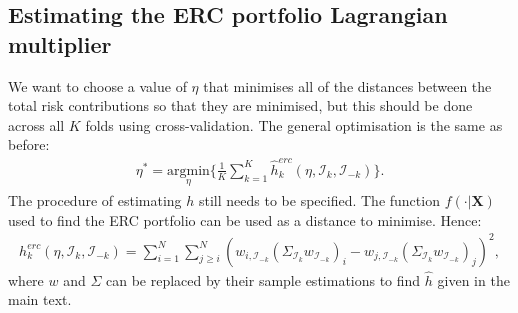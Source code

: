 \documentclass[
]{article}
\begin{document}
\hypertarget{etaest}{%
\subsection{Estimating the ERC portfolio Lagrangian multiplier}\label{etaest}}

We want to choose a value of \(\eta\) that minimises all of the distances between the total risk
contributions so that they are minimised, but this should be done across all \(K\) folds using
cross-validation. The general optimisation is the same as before:
\begin{align}
\eta^* = \underset{\eta}{\text{argmin}} \Big \{ \frac{1}{K} \sum_{k = 1}^K \hat{h}_k^{erc}(\eta, \mathcal{I}_k, \mathcal{I}_{-k})\Big \}.
\end{align}
The procedure of estimating \(h\) still needs to be specified. The function \(f(\cdot|\textbf{X})\) used
to find the ERC portfolio can be used as a distance to minimise. Hence:
\begin{align}
h_k^{erc}(\eta, \mathcal{I}_k, \mathcal{I}_{-k}) = \sum_{i = 1}^N  \sum_{j \geq i}^N(w_{i, \mathcal{I}_{-k}}(\Sigma_{\mathcal{I}_k} w_{\mathcal{I}_{-k}})_i - w_{j, \mathcal{I}_{-k}}(\Sigma_{\mathcal{I}_k} w_{\mathcal{I}_{-k}})_j )^2,
\end{align}
where \(w\) and \(\Sigma\) can be replaced by their sample estimations to find \(\hat{h}\) given in the
main text.

  
\end{document}
